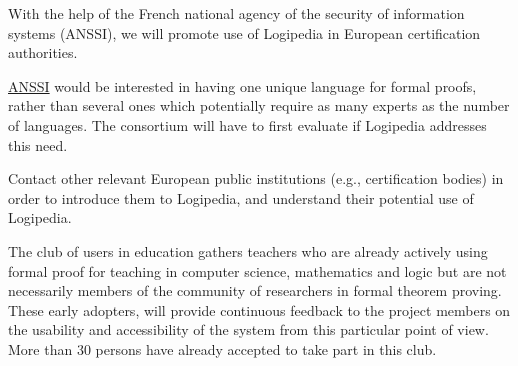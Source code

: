 \begin{workpackage}[id=dissemination,type=MGT,wphases=1-48,
  short={Dissemination},
  title={Dissemination, communication and exploitation},
  lead=Lie,LieRM=3,InrRM=6,BirRM=4,CleRM=2,ImtRM=2,StrRM=2,ZibRM=14,EduRM=12]
\begin{tasklist}
  \begin{task}[id=certifiers-club,
      title=Promoting the use of Logipedia by certification authorities,
      shorttitle=Certif.,
      lead=Imt,ImtRM=2,wphases=1-48!.05]
    With the help of the French national agency of the security of
    information systems (ANSSI), we will promote use of Logipedia in
    European certification authorities.
    \begin{compactitem}
    \item \href{https://www.ssi.gouv.fr/}{ANSSI} would be interested in having one unique language for formal
proofs, rather than several ones which potentially require as many
experts as the number of languages. The consortium will have to first
evaluate if Logipedia addresses 
this need.
\item Contact other relevant European public institutions
(e.g., certification bodies) in order to introduce them to Logipedia,
and understand their potential use of Logipedia.
    \end{compactitem}
  \end{task}

  \begin{task}[id=teachers-club,
      title=Expanding the use of Logipedia in education,
      shorttitle=Educ.,
      lead=Str,StrRM=2,wphases=1-48!.05]
    The club of users in education gathers
    teachers who are already actively using formal proof for teaching
    in computer science, mathematics and logic but are not necessarily
    members of the community of researchers in formal theorem
    proving. These early adopters, will provide continuous feedback to
    the project members on the usability and accessibility of the
    system from this particular point of view.  More than 30 persons
    have already accepted to take part in this club.



\end{task}
\end{tasklist}
\end{workpackage}
